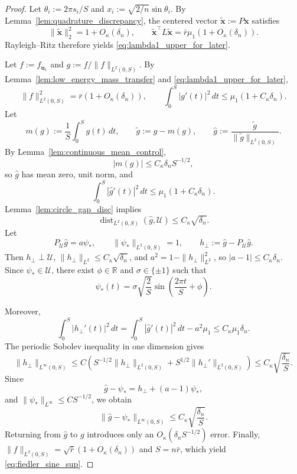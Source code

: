\documentclass[11pt]{article}
\numberwithin{equation}{section}
\theoremstyle{definition}
\theoremstyle{remark}
\begin{document}
\begin{proof}
	Let $\theta_i:=2\pi s_i/S$ and
	$x_i:=\sqrt{2/n}\sin\theta_i$. By
	Lemma~\ref{lem:quadrature_discrepancy}, the centered vector
	$\widetilde{\boldsymbol{x}}:=P\boldsymbol{x}$ satisfies
	\[
	\|\widetilde{\boldsymbol{x}}\|_2^2=1+O_\kappa(\delta_n),
	\qquad
	\widetilde{\boldsymbol{x}}^\top L\widetilde{\boldsymbol{x}}
	=
	\bar r\mu_1(1+O_\kappa(\delta_n)).
	\]
	Rayleigh--Ritz therefore yields \eqref{eq:lambda1_upper_for_later}.
	
	Let $f:=f_{\boldsymbol{u}_1}$ and
	$g:=f/\|f\|_{L^2(0,S)}$. By
	Lemma~\ref{lem:low_energy_mass_transfer} and
	\eqref{eq:lambda1_upper_for_later},
	\[
	\|f\|_{L^2(0,S)}^2=\bar r(1+O_\kappa(\delta_n)),
	\qquad
	\int_0^S|g'(t)|^2\,dt\le \mu_1(1+C_\kappa\delta_n).
	\]
	Let
	\[
	m(g):=\frac1S\int_0^S g(t)\,dt,
	\qquad
	\widetilde g:=g-m(g),
	\qquad
	\widehat g:=\frac{\widetilde g}{\|\widetilde g\|_{L^2(0,S)}}.
	\]
	By Lemma~\ref{lem:continuous_mean_control},
	\[
	|m(g)|\le C_\kappa \delta_n S^{-1/2},
	\]
	so $\widehat g$ has mean zero, unit norm, and
	\[
	\int_0^S|\widehat g'(t)|^2\,dt
	\le \mu_1(1+C_\kappa\delta_n).
	\]
	Lemma~\ref{lem:circle_gap_disc} implies
	\[
	\operatorname{dist}_{L^2(0,S)}(\widehat g,\mathcal U)
	\le C_\kappa\sqrt{\delta_n}.
	\]
	Let
	\[
	P_{\mathcal U}\widehat g=a\psi_*,
	\qquad
	\|\psi_*\|_{L^2(0,S)}=1,
	\qquad
	h_\perp:=\widehat g-P_{\mathcal U}\widehat g.
	\]
	Then $h_\perp\perp\mathcal U$,
	$\|h_\perp\|_{L^2}\le C_\kappa\sqrt{\delta_n}$, and
	$a^2=1-\|h_\perp\|_{L^2}^2$, so $|a-1|\le C_\kappa\delta_n$.
	Since $\psi_*\in\mathcal U$, there exist $\phi\in\mathbb{R}$ and
	$\sigma\in\{\pm1\}$ such that
	\[
	\psi_*(t)=\sigma\sqrt{\frac2S}
	\sin\left(\frac{2\pi t}{S}+\phi\right).
	\]
	
	Moreover,
	\[
	\int_0^S|h_\perp'(t)|^2\,dt
	=
	\int_0^S|\widehat g'(t)|^2\,dt-a^2\mu_1
	\le
	C_\kappa\mu_1\delta_n.
	\]
	The periodic Sobolev inequality in one dimension gives
	\[
	\|h_\perp\|_{L^\infty(0,S)}
	\le
	C\left(
	S^{-1/2}\|h_\perp\|_{L^2(0,S)}
	+
	S^{1/2}\|h_\perp'\|_{L^2(0,S)}
	\right)
	\le
	C_\kappa\sqrt{\frac{\delta_n}{S}}.
	\]
	Since
	\[
	\widehat g-\psi_*=h_\perp+(a-1)\psi_*,
	\]
	and $\|\psi_*\|_{L^\infty}\le CS^{-1/2}$, we obtain
	\[
	\|\widehat g-\psi_*\|_{L^\infty(0,S)}
	\le
	C_\kappa\sqrt{\frac{\delta_n}{S}}.
	\]
	Returning from $\widehat g$ to $g$ introduces only an
	$O_\kappa(\delta_nS^{-1/2})$ error. Finally,
	$\|f\|_{L^2(0,S)}=\sqrt{\bar r}(1+O_\kappa(\delta_n))$ and
	$S=n\bar r$, which yield \eqref{eq:fiedler_sine_sup}.
\end{proof}
\end{document}

